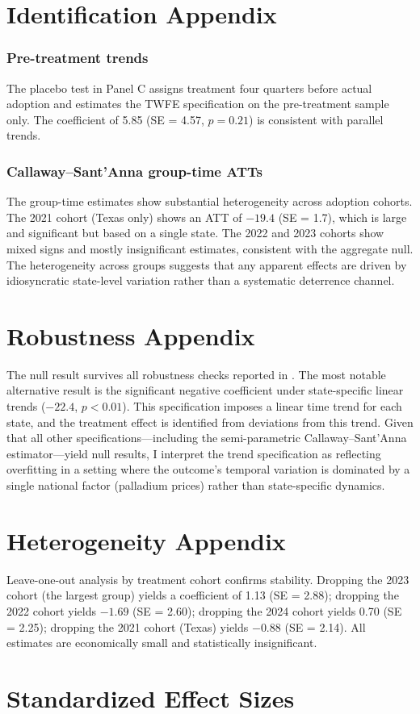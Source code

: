 \documentclass[12pt]{article}
\begin{document}
\section{Identification Appendix}

\subsubsection*{Pre-treatment trends} The placebo test in  Panel C assigns treatment four quarters before actual adoption and estimates the TWFE specification on the pre-treatment sample only. The coefficient of 5.85 (SE = 4.57, $p = 0.21$) is consistent with parallel trends.

\subsubsection*{Callaway--Sant'Anna group-time ATTs} The group-time estimates show substantial heterogeneity across adoption cohorts. The 2021 cohort (Texas only) shows an ATT of $-19.4$ (SE = 1.7), which is large and significant but based on a single state. The 2022 and 2023 cohorts show mixed signs and mostly insignificant estimates, consistent with the aggregate null. The heterogeneity across groups suggests that any apparent effects are driven by idiosyncratic state-level variation rather than a systematic deterrence channel.

\section{Robustness Appendix}

The null result survives all robustness checks reported in . The most notable alternative result is the significant negative coefficient under state-specific linear trends ($-22.4$, $p < 0.01$). This specification imposes a linear time trend for each state, and the treatment effect is identified from deviations from this trend. Given that all other specifications---including the semi-parametric Callaway--Sant'Anna estimator---yield null results, I interpret the trend specification as reflecting overfitting in a setting where the outcome's temporal variation is dominated by a single national factor (palladium prices) rather than state-specific dynamics.

\section{Heterogeneity Appendix}

Leave-one-out analysis by treatment cohort confirms stability. Dropping the 2023 cohort (the largest group) yields a coefficient of 1.13 (SE = 2.88); dropping the 2022 cohort yields $-1.69$ (SE = 2.60); dropping the 2024 cohort yields 0.70 (SE = 2.25); dropping the 2021 cohort (Texas) yields $-0.88$ (SE = 2.14). All estimates are economically small and statistically insignificant.

\section{Standardized Effect Sizes}
\label{sec:sde}


\end{document}
